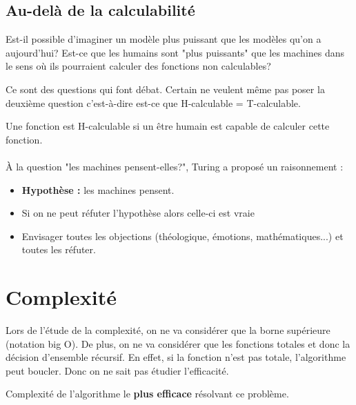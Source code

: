 \subsection{Au-delà de la calculabilité}
\label{sub:au_del_de_la_calculabilit_}
Est-il possible d'imaginer un modèle plus puissant que les modèles qu'on a 
aujourd'hui? Est-ce que les humains sont "plus puissants" que les machines dans 
le sens où ils pourraient calculer des fonctions non calculables?

Ce sont des questions qui font débat. Certain ne veulent même pas 
poser la deuxième question c'est-à-dire est-ce que H-calculable = T-calculable.

\begin{mydef}[H-calculable]
	Une fonction est H-calculable si un être humain
	est capable de calculer cette fonction.
\end{mydef}

\paragraph{} À la question "les machines pensent-elles?", Turing a proposé un 
raisonnement : 
\begin{itemize}
	\item \textbf{Hypothèse :} les machines pensent.
	\item Si on ne peut réfuter l'hypothèse alors celle-ci est vraie
	\item Envisager toutes les objections (théologique, émotions, 
		mathématiques...) et toutes les réfuter.
\end{itemize}


\section{Complexité}
\label{sec:complexit_}
Lors de l'étude de la complexité, on ne va considérer que la borne supérieure 
(notation big O). De plus, on ne va considérer que les fonctions totales et 
donc la décision d'ensemble récursif. 
En effet, si la fonction n'est pas totale, l'algorithme peut boucler. 
Donc on ne sait pas étudier l'efficacité.

\begin{mydef} Complexité de l'algorithme le 
	\textbf{plus efficace} résolvant ce problème.
\end{mydef}

